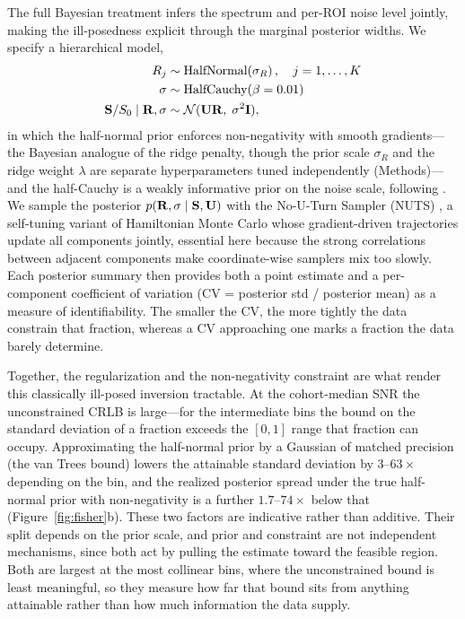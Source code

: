 The full Bayesian treatment infers the spectrum and per-ROI noise level jointly, making the ill-posedness explicit through the marginal posterior widths.
We specify a hierarchical model,
%
\begin{align}
  R_j &\sim \text{HalfNormal}\!\left(\sigma_R\right),
  \quad j = 1, \ldots, K \label{eq:prior_R} \\
  \sigma &\sim \text{HalfCauchy}(\beta = 0.01) \label{eq:prior_sigma} \\
  \mathbf{S} / S_0 \mid \mathbf{R}, \sigma &\sim \mathcal{N}(\mathbf{U} \mathbf{R},\; \sigma^2 \mathbf{I}),
  \label{eq:likelihood}
\end{align}
%
in which the half-normal prior enforces non-negativity with smooth gradients---the Bayesian analogue of the ridge penalty, though the prior scale $\sigma_R$ and the ridge weight $\lambda$ are separate hyperparameters tuned independently (Methods)---and the half-Cauchy is a weakly informative prior on the noise scale, following \citet{gelman2006prior}.
We sample the posterior $p(\mathbf{R}, \sigma \mid \mathbf{S}, \mathbf{U})$ with the No-U-Turn Sampler (NUTS) \citep{hoffman2014nuts}, a self-tuning variant of Hamiltonian Monte Carlo \citep{neal2011mcmc} whose gradient-driven trajectories update all components jointly, essential here because the strong correlations between adjacent components make coordinate-wise samplers mix too slowly.
Each posterior summary then provides both a point estimate and a per-component coefficient of variation (CV = posterior std / posterior mean) as a measure of identifiability. The smaller the CV, the more tightly the data constrain that fraction, whereas a CV approaching one marks a fraction the data barely determine.

Together, the regularization and the non-negativity constraint are what render this classically ill-posed inversion tractable. At the cohort-median SNR the unconstrained CRLB is large---for the intermediate bins the bound on the standard deviation of a fraction exceeds the $[0,1]$ range that fraction can occupy. Approximating the half-normal prior by a Gaussian of matched precision (the van Trees bound) lowers the attainable standard deviation by $3$--$63\times$ depending on the bin, and the realized posterior spread under the true half-normal prior with non-negativity is a further $1.7$--$74\times$ below that (Figure~\ref{fig:fisher}b). These two factors are indicative rather than additive. Their split depends on the prior scale, and prior and constraint are not independent mechanisms, since both act by pulling the estimate toward the feasible region. Both are largest at the most collinear bins, where the unconstrained bound is least meaningful, so they measure how far that bound sits from anything attainable rather than how much information the data supply.


